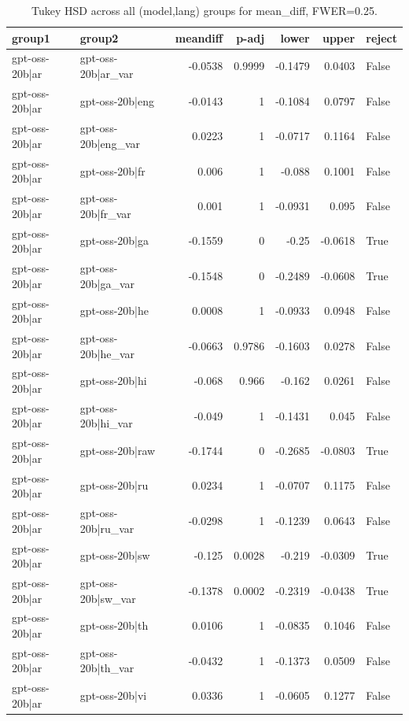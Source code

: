 \begin{table}
\caption{Tukey HSD across all (model,lang) groups for mean_diff, FWER=0.25.}
\label{tab:tukey_all_models_all_langs_mean_diff}
\begin{tabular}{l l r r r r l}
\toprule
group1 & group2 & meandiff & p-adj & lower & upper & reject \\
\midrule
gpt-oss-20b|ar & gpt-oss-20b|ar_var & -0.0538 & 0.9999 & -0.1479 & 0.0403 & False \\
gpt-oss-20b|ar & gpt-oss-20b|eng & -0.0143 & 1 & -0.1084 & 0.0797 & False \\
gpt-oss-20b|ar & gpt-oss-20b|eng_var & 0.0223 & 1 & -0.0717 & 0.1164 & False \\
gpt-oss-20b|ar & gpt-oss-20b|fr & 0.006 & 1 & -0.088 & 0.1001 & False \\
gpt-oss-20b|ar & gpt-oss-20b|fr_var & 0.001 & 1 & -0.0931 & 0.095 & False \\
gpt-oss-20b|ar & gpt-oss-20b|ga & -0.1559 & 0 & -0.25 & -0.0618 & True \\
gpt-oss-20b|ar & gpt-oss-20b|ga_var & -0.1548 & 0 & -0.2489 & -0.0608 & True \\
gpt-oss-20b|ar & gpt-oss-20b|he & 0.0008 & 1 & -0.0933 & 0.0948 & False \\
gpt-oss-20b|ar & gpt-oss-20b|he_var & -0.0663 & 0.9786 & -0.1603 & 0.0278 & False \\
gpt-oss-20b|ar & gpt-oss-20b|hi & -0.068 & 0.966 & -0.162 & 0.0261 & False \\
gpt-oss-20b|ar & gpt-oss-20b|hi_var & -0.049 & 1 & -0.1431 & 0.045 & False \\
gpt-oss-20b|ar & gpt-oss-20b|raw & -0.1744 & 0 & -0.2685 & -0.0803 & True \\
gpt-oss-20b|ar & gpt-oss-20b|ru & 0.0234 & 1 & -0.0707 & 0.1175 & False \\
gpt-oss-20b|ar & gpt-oss-20b|ru_var & -0.0298 & 1 & -0.1239 & 0.0643 & False \\
gpt-oss-20b|ar & gpt-oss-20b|sw & -0.125 & 0.0028 & -0.219 & -0.0309 & True \\
gpt-oss-20b|ar & gpt-oss-20b|sw_var & -0.1378 & 0.0002 & -0.2319 & -0.0438 & True \\
gpt-oss-20b|ar & gpt-oss-20b|th & 0.0106 & 1 & -0.0835 & 0.1046 & False \\
gpt-oss-20b|ar & gpt-oss-20b|th_var & -0.0432 & 1 & -0.1373 & 0.0509 & False \\
gpt-oss-20b|ar & gpt-oss-20b|vi & 0.0336 & 1 & -0.0605 & 0.1277 & False \\

\end{tabular}
\end{table}
